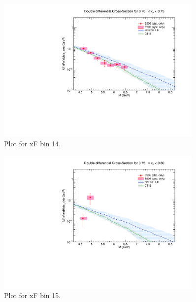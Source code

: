 \begin{figure}[p]
\centering
\includegraphics[width=0.9\textwidth]{./XSecPlots/LH2_14_roofit.pdf}
\caption{Plot for xF bin 14.}
\end{figure}
\clearpage

\begin{figure}[p]
\centering
\includegraphics[width=0.9\textwidth]{./XSecPlots/LH2_15_roofit.pdf}
\caption{Plot for xF bin 15.}
\end{figure}
\clearpage


